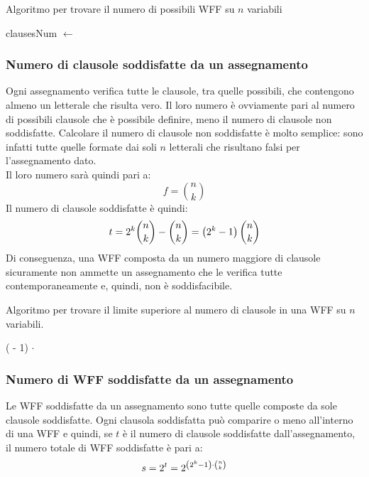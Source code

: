 \begin{algorithm}[H]
    \caption{Algoritmo per trovare il numero di possibili WFF su $n$ variabili}
    \label{alg:calc_wff_num}
    \begin{algorithmic}
            \State clausesNum $\gets$ 
            \State \Return {}
        \EndProcedure
    \end{algorithmic}
\end{algorithm}


\subsubsection{Numero di clausole soddisfatte da un assegnamento}
Ogni assegnamento verifica tutte le clausole, tra quelle possibili, che contengono almeno un letterale
che risulta vero. Il loro numero è ovviamente pari al numero di possibili 
clausole che è possibile definire, meno il numero di clausole non soddisfatte.
Calcolare il numero di clausole non soddisfatte è molto semplice: sono infatti
tutte quelle formate dai soli $n$ letterali che risultano falsi per l'assegnamento dato.\\
Il loro numero sarà quindi pari a:
\begin{equation*}
    f = \binom{n}{k}
\end{equation*}
Il numero di clausole soddisfatte è quindi:
\begin{equation*}
    t = 2^k \binom{n}{k} - \binom{n}{k} = \left(2^k - 1\right) \binom{n}{k}
\end{equation*}
Di conseguenza, una WFF composta da un numero maggiore di clausole
sicuramente non ammette un assegnamento che le verifica tutte contemporaneamente e, quindi,
non è soddisfacibile.

\begin{algorithm}
    \caption{Algoritmo per trovare il limite superiore al numero di clausole in una WFF su $n$ variabili.}
    \label{alg:limit_sup_satisfiability}
    \begin{algorithmic}
            \State \Return ( - 1) $\cdot$ 
        \EndProcedure
    \end{algorithmic}
\end{algorithm}

\subsubsection{Numero di WFF soddisfatte da un assegnamento}
Le WFF soddisfatte da un assegnamento sono tutte quelle composte da sole 
clausole soddisfatte.
Ogni clausola soddisfatta può comparire o meno all'interno di una 
WFF e quindi, se $t$ è il numero di clausole soddisfatte dall'assegnamento,
il numero totale di WFF soddisfatte è pari a:
\begin{equation*}
    s = 2^t = 2^{\left(2^k - 1\right) \cdot \binom{n}{k}}
\end{equation*}

